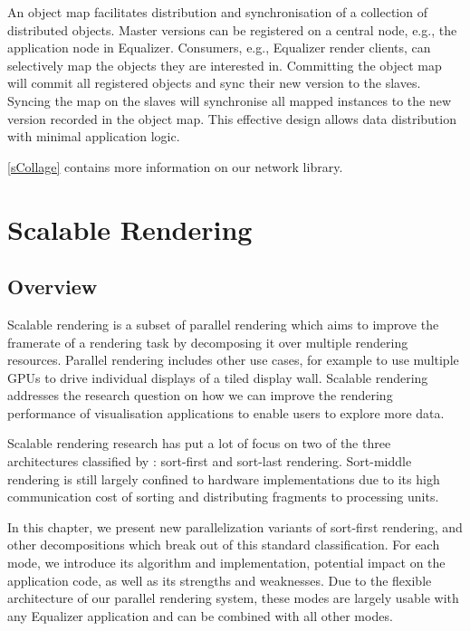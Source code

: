 An object map facilitates distribution and synchronisation of a collection of
distributed objects. Master versions can be registered on a central node, e.g.,
the application node in \textsf{Equalizer}. Consumers, e.g., \textsf{Equalizer}
render clients, can selectively map the objects they are interested in.
Committing the object map will commit all registered objects and sync their new
version to the slaves. Syncing the map on the slaves will synchronise all mapped
instances to the new version recorded in the object map. This effective design
allows data distribution with minimal application logic.

\cref{sCollage} contains more information on our network library.

\chapter{Scalable Rendering}\label{sScalable}

\section{Overview}

Scalable rendering is a subset of parallel rendering which aims to improve the
framerate of a rendering task by decomposing it over multiple rendering
resources. Parallel rendering includes other use cases, for example to use
multiple GPUs to drive individual displays of a tiled display wall. Scalable rendering addresses the research question on how we can improve the rendering performance of visualisation applications to enable users to explore more data.

Scalable rendering research has put a lot of focus on two of the three
architectures classified by \cite{Molnar92}: sort-first and sort-last rendering.
Sort-middle rendering is still largely confined to hardware implementations due
to its high communication cost of sorting and distributing fragments to
processing units.

In this chapter, we present new parallelization variants of sort-first
rendering, and other decompositions which break out of this standard
classification. For each mode, we introduce its algorithm and implementation,
potential impact on the application code, as well as its strengths and
weaknesses. Due to the flexible architecture of our parallel rendering system,
these modes are largely usable with any Equalizer application and can be
combined with all other modes.

